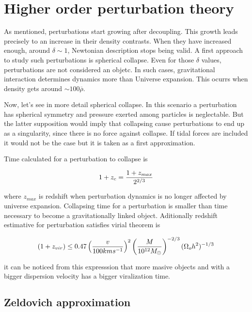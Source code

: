 \section{ Higher order perturbation theory }

As mentioned, perturbations start growing after decoupling. This growth leads
precisely to an increase in their density contrasts. 
When they have increased enough, around $\delta\sim 1$, Newtonian description 
stops being valid. A first approach to study such perturbations is spherical collapse. 
Even for those $\delta$ values, perturbations are not considered an objetc. 
In such cases, gravitational interaction determines dynamics more than Universe
expansion. This ocurrs when density gets around $\sim 100 \overline{\rho}$. 

Now, let's see in more detail spherical collapse. In this scenario a perturbation
has spherical symmetry and pressure exerted among particles is neglectable. 
But the latter supposition would imply that collapsing cause perturbations 
to end up as a singularity, since there is no force against collapse.
If tidal forces are included it would not be the case but it is taken 
as a first approximation.

Time calculated for a perturbation to collapse is 

\[
1+z_c = \frac{1+z_{max}}{2^{2/3}}
\]

where $z_{max}$ is redshift when perturbation dynamics is no longer affected by universe
expansion. Collapsing time for a perturbation is smaller than time necessary to become 
a gravitationally linked object. Aditionally redshift estimative for perturbation
satisfies virial theorem is

\[
(1+z_{vir})\leq 0.47\left( \frac{v}{100kms^{-1}}\right)^2\left( \frac{M}{10^{12}M_{\odot}}\right)^{-2/3}(\Omega_oh^2)^{-1/3}
\]

it can be noticed from this expresssion that more masive objects and with a bigger 
dispersion velocity has a bigger viralization time. 

\subsection{ Zeldovich approximation }


